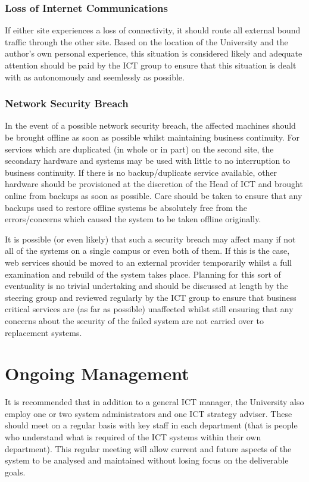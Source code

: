 \documentclass[a4paper, twoside]{article}
\begin{document}
\subsubsection{Loss of Internet Communications}
If either site experiences a loss of connectivity, it should route all external
bound traffic through the other site. Based on the location of the University
and the author's own personal experience, this situation is considered likely
and adequate attention should be paid by the ICT group to ensure that this
situation is dealt with as autonomously and seemlessly as possible.

\subsubsection{Network Security Breach}
In the event of a possible network security breach, the affected machines should
be brought offline as soon as possible whilst maintaining business continuity.
For services which are duplicated (in whole or in part) on the second site, the
secondary hardware and systems may be used with little to no interruption to
business continuity. If there is no backup/duplicate service available, other
hardware should be provisioned at the discretion of the Head of ICT and brought
online from backups as soon as possible. Care should be taken to ensure that any
backups used to restore offline systems be absolutely free from the
errors/concerns which caused the system to be taken offline originally.

It is possible (or even likely) that such a security breach may affect many if
not all of the systems on a single campus or even both of them. If this is the
case, web services should be moved to an external provider temporarily whilst a
full examination and rebuild of the system takes place. Planning for this sort
of eventuality is no trivial undertaking and should be discussed at length by
the steering group and reviewed regularly by the ICT group to ensure that
business critical services are (as far as possible) unaffected whilst still
ensuring that any concerns about the security of the failed system are not
carried over to replacement systems.

\section{Ongoing Management}
\label{sec:manage}
It is recommended that in addition to a general ICT manager, the University also
employ one or two system administrators and one ICT strategy adviser. These
should meet on a regular basis with key staff in each department (that is people
who understand what is required of the ICT systems within their own department).
This regular meeting will allow current and future aspects of the system to be
analysed and maintained without losing focus on the deliverable goals.
\end{document}
